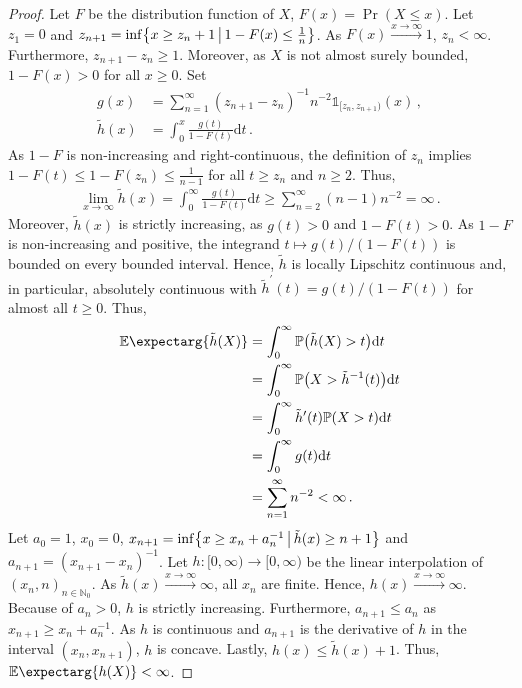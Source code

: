 \documentclass{scrartcl}
\newcommand{\PrOf}[1]{\Pr\mathopen{}\lb #1 \rb\mathclose{}}
\newcommand{\Prof}[1]{\Pr(#1)}
\newcommand{\Ex}{\E\expectarg}
\newcommand{\N}{\mathbb{N}}
\newcommand{\pr}{^\prime}
\newcommand{\dl}{\mathrm{d}}
\newcommand{\ind}{\mathds{1}}\newcommand{\indOf}[1]{\ind_{\!#1}}\newcommand{\indOfOf}[2]{\ind_{\!#1}\!\brOf{#2}}\newcommand{\indOfEvent}[1]{\indOf{\cbOf{#1}}}\newcommand{\indOfEventOf}[2]{\indOf{\cbOf{#1}}\!\brOf{#2}}\newcommand{\compl}{^\mathsf{c}}\DeclareMathOperator{\landauO}{\mathcal{O}}\newcommand{\landauOOf}[1]{\landauO\brOf{#1}}\DeclareMathOperator{\landauOmega}{\Omega}\newcommand{\landauOmegaOf}[1]{\landauOmega\brOf{#1}}\DeclareMathOperator{\landauTheta}{\Theta}\newcommand{\landauThetaOf}[1]{\landauTheta\brOf{#1}}\newcommand{\norm}{\left\Vert \cdot \right\Vert}
\newcommand{\equationFullstop}{\, .}
\newcommand{\eqfs}{\equationFullstop}
\newcommand{\equationComma}{\, ,}
\newcommand{\eqcm}{\equationComma}
\theoremstyle{plain}\newtheorem{theorem}{Theorem}[section]
\theoremstyle{definition}
\theoremstyle{remark}
\begin{document}
\begin{appendix}
\begin{proof}
	Let $F$ be the distribution function of $X$, $F(x) = \Prof{X \leq x}$.
	Let $z_1 = 0$ and $z_{n+1} = \inf \mathopen{}\left\lbrace x\geq z_n +1 \,\big\vert\, 1-F(x) \leq \frac1n \right\rbrace\mathclose{}$. As $F(x)\xrightarrow{x\to\infty} 1$, $z_n < \infty$. Furthermore, $z_{n+1}-z_n \geq 1$. Moreover, as $X$ is not almost surely bounded, $1-F(x) > 0$ for all $x\geq 0$. Set 
	\begin{align*}
		g(x) &= \sum_{n=1}^\infty (z_{n+1}-z_n)^{-1}n^{-2}\ind_{[z_n, z_{n+1})} (x)
		\eqcm
		\\
		\tilde h(x) &= \int_0^x \frac{g(t)}{1-F(t)} \dl t
		\eqfs
	\end{align*}
	As $1-F$ is non-increasing and right-continuous, the definition of $z_n$ implies $1-F(t) \leq 1-F(z_n) \leq \frac1{n-1}$ for all $t\geq z_n$ and $n\geq2$. Thus,
	\begin{align*}
		\lim_{x\to\infty} \tilde h(x)
		=
		\int_0^\infty \frac{g(t)}{1-F(t)} \dl t
		\geq
		\sum_{n=2}^\infty (n-1) n^{-2}
		=
		\infty
		\eqfs
	\end{align*}
	Moreover, $\tilde h(x)$ is strictly increasing, as $g(t) > 0$ and $1-F(t) > 0$.
	As $1-F$ is non-increasing and positive, the integrand $t \mapsto g(t)/(1-F(t))$ is bounded on every bounded interval. Hence, $\tilde h$ is locally Lipschitz continuous and, in particular, absolutely continuous with $\tilde h\pr(t) = g(t)/(1-F(t))$ for almost all $t\geq0$. Thus,
	\begin{align*}
		\Ex{\tilde h(X)}
		&=
		\int_0^\infty \PrOf{\tilde h(X) > t} \dl t
		\\&=
		\int_0^\infty \PrOf{X > \tilde h^{-1}(t)} \dl t
		\\&=
		\int_0^\infty \tilde h\pr(t) \PrOf{X > t} \dl t
		\\&=
		\int_0^\infty g(t) \dl t
		\\&=
		\sum_{n=1}^\infty n^{-2}
		<
		\infty
		\eqfs
	\end{align*}
	Let $a_0 = 1$, $x_0=0$, $x_{n+1} = \inf\mathopen{}\left\lbrace x \geq x_n + a_n^{-1} \,\big\vert\, \tilde h(x) \geq n+1 \right\rbrace\mathclose{}$ and $a_{n+1} = (x_{n+1} - x_n)^{-1}$. Let $h \colon [0,\infty) \to [0,\infty)$ be the linear interpolation of $(x_n, n)_{n\in\N_0}$. 
	As $\tilde h(x) \xrightarrow{x\to\infty}\infty$, all $x_n$ are finite. Hence, $h(x) \xrightarrow{x\to\infty}\infty$. 
	Because of $a_n > 0$, $h$ is strictly increasing.
	Furthermore, $a_{n+1} \leq a_n$ as $x_{n+1} \geq x_n + a_n^{-1}$. As $h$ is continuous and $a_{n+1}$ is the derivative of $h$ in the interval $(x_n, x_{n+1})$, $h$ is concave. 
	Lastly, $h(x) \leq \tilde h(x) + 1$. Thus, $\Ex{h(X)} < \infty$.

\end{proof}
\end{appendix}
\end{document}
